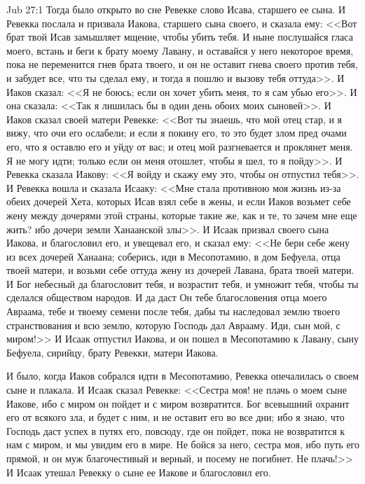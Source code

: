 \vs Jub 27:1
Тогда было открыто во сне Ревекке слово Исава,
старшего ее сына. И Ревекка послала и призвала
Иакова, старшего сына своего, и сказала ему:
<<Вот брат твой Исав замышляет мщение, чтобы
убить тебя. И ныне послушайся гласа моего, встань
и беги к брату моему Лавану, и оставайся у него
некоторое время, пока не переменится гнев брата
твоего, и он не оставит гнева своего против тебя,
и забудет все, что ты сделал ему, и тогда я пошлю и
вызову тебя оттуда>>. И Иаков сказал: <<Я не
боюсь; если он хочет убить меня, то я сам убью
его>>. И она сказала: <<Так я лишилась бы в один
день обоих моих сыновей>>. И Иаков сказал своей
матери Ревекке: <<Вот ты знаешь, что мой отец
стар, и я вижу, что очи его ослабели; и если я
покину его, то это будет злом пред очами его, что я
оставлю его и уйду от вас; и отец мой разгневается
и проклянет меня. Я не могу идти; только если он
меня отошлет, чтобы я шел, то я пойду>>. И Ревекка
сказала Иакову: <<Я войду и скажу ему это, чтобы
он отпустил тебя>>. И Ревекка вошла и сказала
Исааку: <<Мне стала противною моя жизнь из-за
обеих дочерей Хета, которых Исав взял себе в жены,
и если Иаков возьмет себе жену между дочерями этой
страны, которые такие же, как и те, то зачем
мне еще жить? ибо дочери земли Ханаанской злы>>.
И Исаак призвал своего сына Иакова, и благословил
его, и увещевал его, и сказал ему: <<Не бери себе
жену из всех дочерей Ханаана; соберись, иди в
Месопотамию, в дом Бефуела, отца твоей матери, и
возьми себе оттуда жену из дочерей Лавана, брата
твоей матери. И Бог небесный да благословит тебя,
и возрастит тебя, и умножит тебя, чтобы ты
сделался обществом народов. И да даст Он тебе
благословения отца моего Авраама, тебе и твоему
семени после тебя, дабы ты наследовал землю
твоего странствования и всю землю, которую
Господь дал Аврааму. Иди, сын мой, с миром!>> И
Исаак отпустил Иакова, и он пошел в Месопотамию к
Лавану, сыну Бефуела, сирийцу, брату Ревекки,
матери Иакова.

И было, когда Иаков собрался идти в Месопотамию,
Ревекка опечалилась о своем сыне и плакала. И
Исаак сказал Ревекке: <<Сестра моя! не плачь о
моем сыне Иакове, ибо с миром он пойдет и с миром
возвратится. Бог всевышний охранит его от
всякого зла, и будет с ним, и не оставит его во все
дни; ибо я знаю, что Господь даст успех в путях
его, повсюду, где он пойдет, пока не возвратится к
нам с миром, и мы увидим его в мире. Не бойся за
него, сестра моя, ибо путь его прямой, и он муж
благочестивый и верный, и посему не погибнет.
Не плачь!>> И Исаак утешал Ревекку о сыне ее
Иакове и благословил его.


